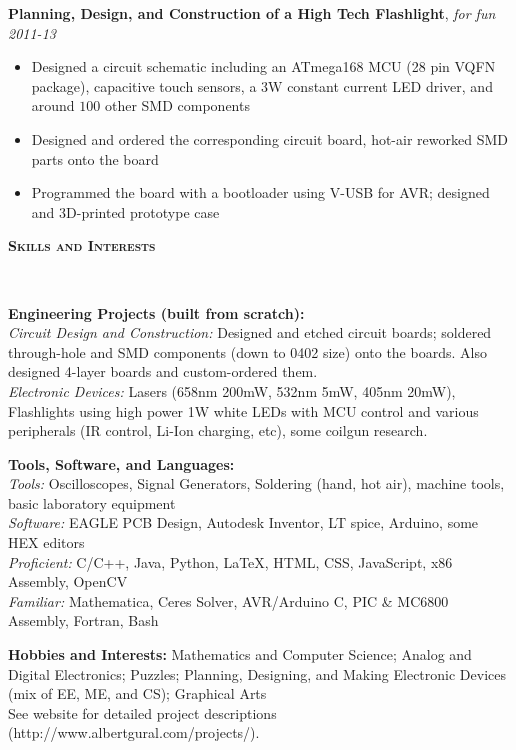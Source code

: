 \documentclass{article}
\newenvironment{changemargin}[2]{%
  \begin{list}{}{%
    \setlength{\topsep}{0pt}%
    \setlength{\leftmargin}{#1}%
    \setlength{\rightmargin}{#2}%
    \setlength{\listparindent}{\parindent}%
    \setlength{\itemindent}{\parindent}%
    \setlength{\parsep}{\parskip}%
  }%
  \item[]}{\end{list}
}
\newcommand{\lineover}{
	\begin{changemargin}{-0.05in}{-0.05in}
		\vspace*{-8pt}
		\hrulefill \\
		\vspace*{-2pt}
	\end{changemargin}
}
\newcommand{\header}[1]{
	\begin{changemargin}{-0.5in}{-0.5in}
		{\large \textbf{\scshape{#1}}}\\
  	\lineover
	\end{changemargin}
}
\newenvironment{body} {
	\vspace*{-16pt}
	\begin{changemargin}{-0.25in}{-0.5in}
  }	
	{\end{changemargin}
}
\begin{document}
\begin{body}
	\textbf{Planning, Design, and Construction of a High Tech Flashlight}, \emph{for fun} \hfill \emph{2011-13}\\
	\vspace*{-4pt}
	\begin{itemize}
		\item Designed a circuit schematic including an ATmega168 MCU (28 pin VQFN package), capacitive touch sensors, a 3W constant current LED driver, and around $100$ other SMD components
		\item Designed and ordered the corresponding circuit board, hot-air reworked SMD parts onto the board
		\item Programmed the board with a bootloader using V-USB for AVR; designed and 3D-printed prototype case
	\end{itemize}
\end{body}

\smallskip


\header{Skills and Interests}

\begin{body}
	\vspace{14pt}
	\textbf{Engineering Projects (built from scratch):} \\
	\textit{Circuit Design and Construction:} Designed and etched circuit boards; soldered through-hole and SMD components (down to 0402 size) onto the boards.  Also designed 4-layer boards and custom-ordered them.\\
	\textit{Electronic Devices:} Lasers (658nm 200mW, 532nm 5mW, 405nm 20mW), Flashlights using high power 1W white LEDs with MCU control and various peripherals (IR control, Li-Ion charging, etc), some coilgun research. \\
	
	\medskip

	\textbf{Tools, Software, and Languages:} \\
	\textit{Tools:} Oscilloscopes, Signal Generators, Soldering (hand, hot air), machine tools, basic laboratory equipment \\
	\textit{Software:} EAGLE PCB Design, Autodesk Inventor, LT spice, Arduino, some HEX editors \\
	\textit{Proficient:} C/C++, Java, Python, \LaTeX, HTML, CSS, JavaScript, x86 Assembly, OpenCV \\ 
	\textit{Familiar:} Mathematica, Ceres Solver, AVR/Arduino C, PIC \& MC6800 Assembly, Fortran, Bash \\

	\medskip

	\textbf{Hobbies and Interests:} Mathematics and Computer Science; Analog and Digital Electronics; Puzzles; Planning, Designing, and Making Electronic Devices (mix of EE, ME, and CS); Graphical Arts \\ See website for detailed project descriptions (http://www.albertgural.com/projects/). \\
\end{body}

\smallskip
\end{document}
